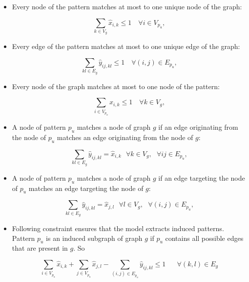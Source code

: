 \begin{itemize}
\item Every node of the pattern matches at most to one unique node of the graph:

\begin{equation}
\sum_{k\in V_g}\hat{x}_{i,k} \leq 1 \quad \forall i\in V_{p_{u}},
\end{equation}

\item Every edge of the pattern matches at most to one unique edge of the graph:

\begin{equation}
\sum_{kl\in E_g}\hat{y}_{ij,kl} \leq 1 \quad \forall (i,j)\in E_{p_{u}},
\end{equation}

\item Every node of the graph matches at most to one node of the pattern:

\begin{equation}
\sum_{i\in V_{p_{u}}}\hat{x}_{i,k} \leq 1 \quad \forall k\in V_g,
\end{equation}

\item A node of pattern $p_u$ matches a node of graph $g$ if an edge originating from the node of $p_u$ matches an edge originating from the node of $g$:

\begin{equation}
\sum_{kl \in E_g}\hat{y}_{ij,kl} =  \hat{x}_{i,k}\textit{  }\forall k \in V_g, \textit{  }\forall ij \in E_{p_{u}},
\end{equation}

\item A node of pattern $p_u$ matches a node of graph $g$ if an edge targeting the node of $p_u$ matches an edge targeting the node of $g$:

\begin{equation}
\sum_{kl \in E_g}\hat{y}_{ij,kl} =  \hat{x}_{j,l}\textit{  }\forall l \in V_g,\textit{  }\forall (i,j) \in E_{p_{u}},
\end{equation}

\item Following constraint ensures that the model extracts induced patterns.  
Pattern $p_{u}$ is an induced subgraph of graph $g$ if $p_{u}$ contains all possible edges that are present in $g$. 
So

\begin{equation}
\sum_{i \in V_{p_{u}}}\hat{x}_{i,k} + \sum_{j \in V_{p_{u}}}\hat{x}_{j,l} - \sum_{(i,j)\in E_{p_{u}}}\hat{y}_{ij,kl} \leq 1
 \quad\textit{  }\forall (k,l)\in E_g
\end{equation}
\end{itemize}

